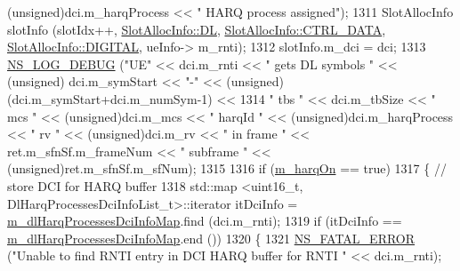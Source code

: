 \begin{DoxyCode}
{       (unsigned)dci.m\_harqProcess << " HARQ process assigned");}
1311                         SlotAllocInfo slotInfo (slotIdx++, \hyperlink{structns3_1_1SlotAllocInfo_a6cad60db1d39034f1851e2cea625fe5da9a365c9c56b7c32dcae38ee1a468ce6d}{SlotAllocInfo::DL}, 
      \hyperlink{structns3_1_1SlotAllocInfo_a3ea7cb503bfd0c9a4df55a71b81b9331a1ea636c3f068558fabacbc39934309b8}{SlotAllocInfo::CTRL\_DATA}, \hyperlink{structns3_1_1SlotAllocInfo_adcbd067d82be6260b3399167d8f0b4eca47a67c342db658a08ded9ce4b49417ea}{SlotAllocInfo::DIGITAL}, ueInfo->
      m\_rnti);
1312                         slotInfo.m\_dci = dci;
1313                         \hyperlink{group__logging_ga413f1886406d49f59a6a0a89b77b4d0a}{NS\_LOG\_DEBUG} (\textcolor{stringliteral}{"UE"} << dci.m\_rnti << \textcolor{stringliteral}{" gets DL symbols "} << (\textcolor{keywordtype}{unsigned})
      dci.m\_symStart << \textcolor{stringliteral}{"-"} << (\textcolor{keywordtype}{unsigned})(dci.m\_symStart+dci.m\_numSym-1) <<
1314                                                                                 \textcolor{stringliteral}{" tbs "} << dci.m\_tbSize << \textcolor{stringliteral}{
      " mcs "} << (\textcolor{keywordtype}{unsigned})dci.m\_mcs << \textcolor{stringliteral}{" harqId "} << (\textcolor{keywordtype}{unsigned})dci.m\_harqProcess << \textcolor{stringliteral}{" rv "} << (\textcolor{keywordtype}{unsigned})dci.m\_rv 
      << \textcolor{stringliteral}{" in frame "} << ret.m\_sfnSf.m\_frameNum << \textcolor{stringliteral}{" subframe "} << (\textcolor{keywordtype}{unsigned})ret.m\_sfnSf.m\_sfNum);
1315 
1316                         \textcolor{keywordflow}{if} (\hyperlink{classns3_1_1MmWaveFlexTtiMaxWeightMacScheduler_af63eec946bdf0fb2db0c66104e95f1a6}{m\_harqOn} == \textcolor{keyword}{true})
1317                         \{       \textcolor{comment}{// store DCI for HARQ buffer}
1318                                 std::map <uint16\_t, DlHarqProcessesDciInfoList\_t>::iterator itDciInfo = 
      \hyperlink{classns3_1_1MmWaveFlexTtiMaxWeightMacScheduler_ac833e86e5419d19a445f1e359d06486e}{m\_dlHarqProcessesDciInfoMap}.find (dci.m\_rnti);
1319                                 \textcolor{keywordflow}{if} (itDciInfo == \hyperlink{classns3_1_1MmWaveFlexTtiMaxWeightMacScheduler_ac833e86e5419d19a445f1e359d06486e}{m\_dlHarqProcessesDciInfoMap}.end
       ())
1320                                 \{
1321                                         \hyperlink{group__fatal_ga5131d5e3f75d7d4cbfd706ac456fdc85}{NS\_FATAL\_ERROR} (\textcolor{stringliteral}{"Unable to find RNTI entry in DCI
       HARQ buffer for RNTI "} << dci.m\_rnti);

\end{DoxyCode}
